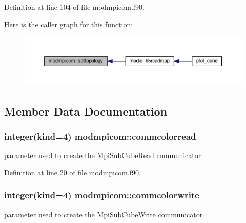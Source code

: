 Definition at line 104 of file modmpicom.\-f90.



Here is the caller graph for this function\-:\nopagebreak
\begin{figure}[H]
\begin{center}
\leavevmode
\includegraphics[width=350pt]{classmodmpicom_a158a13b594a854025da3c47f32a493de_icgraph}
\end{center}
\end{figure}




\subsection{Member Data Documentation}
\hypertarget{classmodmpicom_a0ba0397b7d92b456e11a65bce1f86e7c}{
\subsubsection[{commcolorread}]{\setlength{\rightskip}{0pt plus 5cm}integer(kind=4) modmpicom\-::commcolorread}}\label{classmodmpicom_a0ba0397b7d92b456e11a65bce1f86e7c}


parameter used to create the Mpi\-Sub\-Cube\-Read communicator 



Definition at line 20 of file modmpicom.\-f90.

\hypertarget{classmodmpicom_a10897435b88ede934389b5099b4a2f7f}{
\subsubsection[{commcolorwrite}]{\setlength{\rightskip}{0pt plus 5cm}integer(kind=4) modmpicom\-::commcolorwrite}}\label{classmodmpicom_a10897435b88ede934389b5099b4a2f7f}


parameter used to create the Mpi\-Sub\-Cube\-Write communicator 



